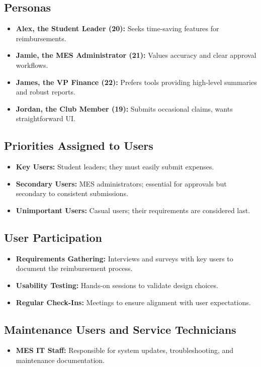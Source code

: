 \documentclass[12pt]{article}
\begin{document}
\subsection{Personas}
\begin{itemize}
  \item \textbf{Alex, the Student Leader (20):} Seeks time-saving features for reimbursements.
  \item \textbf{Jamie, the MES Administrator (21):} Values accuracy and clear approval workflows.
  \item \textbf{James, the VP Finance (22):} Prefers tools providing high-level summaries and robust reports.
  \item \textbf{Jordan, the Club Member (19):} Submits occasional claims, wants straightforward UI.
\end{itemize}

\subsection{Priorities Assigned to Users}
\begin{itemize}
    \item \textbf{Key Users:} Student leaders; they must easily submit expenses.
    \item \textbf{Secondary Users:} MES administrators; essential for approvals but secondary to consistent submissions.
    \item \textbf{Unimportant Users:} Casual users; their requirements are considered last.
\end{itemize}

\subsection{User Participation}
\begin{itemize}
    \item \textbf{Requirements Gathering:} Interviews and surveys with key users to document the reimbursement process.
    \item \textbf{Usability Testing:} Hands-on sessions to validate design choices.
    \item \textbf{Regular Check-Ins:} Meetings to ensure alignment with user expectations.
\end{itemize}

\subsection{Maintenance Users and Service Technicians}
\begin{itemize}
    \item \textbf{MES IT Staff:} Responsible for system updates, troubleshooting, and maintenance documentation.
\end{itemize}
\end{document}
